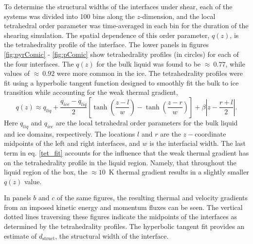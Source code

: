 \documentclass[aps,jcp,preprint,showpacs,superscriptaddress,groupedaddress]{revtex4}  %
\begin{document}
To determine the structural widths of the interfaces under shear, each
of the systems was divided into 100 bins along the $z$-dimension, and
the local tetrahedral order parameter was time-averaged in each bin for the 
duration of
the shearing simulation.  The spatial dependence of this order
parameter, $q(z)$, is the tetrahedrality profile of the interface.
The lower panels in figures \ref{fig:pyrComic} - \ref{fig:pComic} show
tetrahedrality profiles (in circles) for each of the four interfaces.
The $q(z)$ for the
bulk liquid was found to be $\approx~0.77$, while values of
$\approx~0.92$ were more common in the ice. The tetrahedrality
profiles were fit using a hyperbolic tangent function 
designed to smoothly fit the bulk to ice
transition while accounting for the weak thermal gradient, 
\begin{equation}\label{tet_fit}
q(z) \approx
q_{liq}+\frac{q_{ice}-q_{liq}}{2}\left[\tanh\left(\frac{z-l}{w}\right)-\tanh\left(\frac{z-r}{w}\right)\right]+\beta\left|z-\frac{r+l}{2}\right|.
\end{equation}
Here $q_{liq}$ and $q_{ice}$ are the local tetrahedral order parameters
for the bulk liquid and ice domains, respectively.
The locations $l$ and $r$ are the $z-$coordinate midpoints of the left and 
right interfaces, and $w$ is the interfacial width. 
The last term in eq. \eqref{tet_fit}
accounts for the influence that the weak thermal gradient has on the
tetrahedrality profile in the liquid region. Namely, that throughout the liquid
region of the box, the $\approx 10$~K thermal gradient results in a slightly 
smaller $q(z)$ value.

In panels
$b$ and $c$ of the same figures, the resulting thermal and velocity
gradients from an imposed kinetic energy and momentum fluxes can be
seen. The vertical dotted lines traversing these figures indicate the
midpoints of the interfaces as determined by the tetrahedrality
profiles.  The hyperbolic tangent fit provides an estimate of
$d_\mathrm{struct}$, the structural width of the interface.
 
\end{document}
